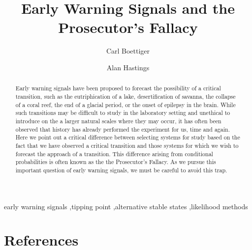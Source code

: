 \documentclass[authoryear,preprint,11pt]{elsarticle}
\begin{document}
\begin{frontmatter}
  \title{Early Warning Signals and the Prosecutor's Fallacy}
  \author[cpb]{Carl Boettiger}
  \author[esp]{Alan Hastings}
  \address[cpb]{Center for Population Biology, 1 Shields Avenue, University of California, Davis, CA, 95616 United States.}
  \address[esp]{Department of Environmental Science and Policy, University of California, Davis} 


  \begin{abstract}

  Early warning signals have been proposed to forecast the possibility of a 
  critical transition, such as the eutriphication of a lake, desertification
  of savanna, the collapse of a coral reef, the end of a glacial period, or 
  the onset of epilepsy in the brain.  While such transitions may be difficult
  to study in the laboratory setting and unethical to introduce on the a larger
  natural scales where they may occur, it has often been observed that history
  has already performed the experiment for us, time and again.  Here we point 
  out a critical difference between selecting systems for study based on the 
  fact that we have observed a critical transition and those systems for which
  we wish to forecast the approach of a transition. This difference arising
  from conditional probabilities is often known as the the Prosecutor's 
  Fallacy.  As we pursue this important question of early warning signals, 
  we must be careful to avoid this trap.  

  \end{abstract}

  \begin{keyword}
early warning signals \sep tipping point \sep alternative stable states \sep likelihood methods 
   \end{keyword}
 \end{frontmatter}
 \section{References}%
 
 
\end{document}
